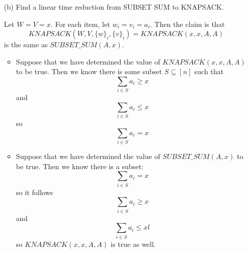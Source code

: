 \documentclass{article}
\begin{document}
\begin{itemize}
        \item [(b)] Find a linear time reduction from SUBSET SUM to KNAPSACK.
            \begin{answer}
                Let $W = V = x$. For each item, let $w_{i} = v_{i} = a_{i}$. Then the claim is that 
                    \begin{equation*}
                        KNAPSACK(W, V, \{w\}_{i}, \{v\}_{i}) = KNAPSACK(x, x, A, A)
                    \end{equation*}
                is the same as $SUBSET\_SUM(A, x)$.
                    \begin{itemize}
                        \item Suppose that we have determined the value of $KNAPSACK(x, x, A, A)$ to be true. Then we know there is some subset $S \subseteq [n]$ such that
                            \begin{equation*}
                                \sum_{i \in S} a_{i} \geq x
                            \end{equation*}
                        and
                            \begin{equation*}
                                \sum_{i \in S} a_{i} \leq x 
                            \end{equation*}
                        so
                            \begin{equation*}
                                \sum_{i \in S} a_{i} = x
                            \end{equation*}

                        \item Suppose that we have determined the value of $SUBSET\_SUM(A, x)$ to be true. Then we know there is a subset:
                            \begin{equation*}
                                \sum_{i \in S} a_{i} = x 
                            \end{equation*}
                        so it follows
                            \begin{equation*}
                                \sum_{i \in S} a_{i} \geq x
                            \end{equation*}
                        and
                            \begin{equation*}
                                \sum_{i \in S} a_{i} \leq x 
           l                \end{equation*}
                        so $KNAPSACK(x, x, A, A)$ is true  as well.
                    \end{itemize}
            \end{answer}
    \end{itemize}
\end{document}
